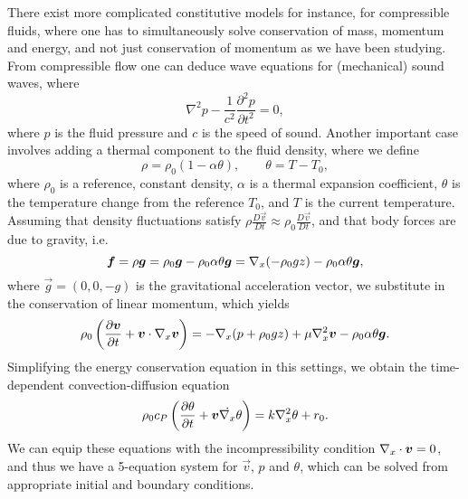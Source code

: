 There exist more complicated constitutive models for instance, for compressible fluids, where one has to simultaneously solve conservation of mass, momentum and energy, and not just conservation of momentum as we have been studying. From compressible flow one can deduce wave equations for (mechanical) sound waves, where 
\begin{equation*}
    \nabla^2 p - \frac{1}{c^2}\frac{\partial^2 p}{\partial t^2} = 0,
\end{equation*}
where $p$ is the fluid pressure and $c$ is the speed of sound. Another important case involves adding a thermal component to the fluid density, where we define 
\begin{equation*}
    \rho = \rho_0 (1-\alpha \theta),\qquad \theta = T - T_0,
\end{equation*}
where $\rho_0$ is a reference, constant density, $\alpha$ is a thermal expansion coefficient, $\theta$ is the temperature change from the reference $T_0$, and $T$ is the current temperature. Assuming that density fluctuations satisfy $\rho\frac{D\vec v}{Dt}\approx \rho_0\frac{D\vec v}{Dt}$, and that body forces are due to gravity, i.e.
\begin{equation*}
    \vec f = \rho\vec g = \rho_0\vec g - \rho_0\alpha\theta \vec g = \vx(-\rho_0 g z) - \rho_0\alpha\theta\vec g,
\end{equation*}
where $\vec g = (0,0,-g)$ is the gravitational acceleration vector, we substitute in the conservation of linear momentum, which yields 
\begin{equation*}
    \rho_0\left(\frac{\partial\vec v}{\partial t}+\vec v \cdot\vx\vec v\right) = -\vx(p+\rho_0 g z) + \mu\vx^2\vec v - \rho_0 \alpha  \theta\vec g.
\end{equation*} 
Simplifying the energy conservation equation in this settings, we obtain the time-dependent convection-diffusion equation 
\begin{equation*}
    \rho_0 c_P\left(\frac{\partial \theta}{\partial t} + \vec v \dot\vx\theta\right) = k\vx^2\theta + r_0.
\end{equation*}
We can equip these equations with the incompressibility condition $\vx\cdot\vec v = 0$, and thus we have a 5-equation system for $\vec v$, $p$ and $\theta$, which can be solved from appropriate initial and boundary conditions. 

